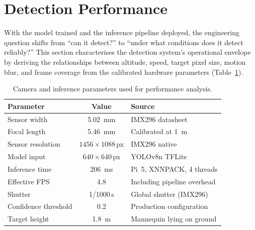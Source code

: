 \documentclass[10pt,a4paper]{article}
\begin{document}

\section{Detection Performance}\label{sec:performance}

With the model trained and the inference pipeline deployed, the engineering question shifts from ``can it detect?'' to ``under what conditions does it detect reliably?'' This section characterises the detection system's operational envelope by deriving the relationships between altitude, speed, target pixel size, motion blur, and frame coverage from the calibrated hardware parameters (Table~\ref{tab:vision-params}).

\begin{table}[ht]
  \centering
  \caption{Camera and inference parameters used for performance analysis.}\label{tab:vision-params}
  \begin{tabular}{@{}l c l@{}}
    \toprule
    \textbf{Parameter} & \textbf{Value} & \textbf{Source} \\
    \midrule
    Sensor width            & \SI{5.02}{\milli\metre} & IMX296 datasheet \\
    Focal length            & \SI{5.46}{\milli\metre} & Calibrated at \SI{1}{\metre} \\
    Sensor resolution       & $1456 \times 1088$\,px  & IMX296 native \\
    Model input             & $640 \times 640$\,px    & YOLOv8n TFLite \\
    Inference time          & \SI{206}{\milli\second}  & Pi~5, XNNPACK, 4 threads \\
    Effective FPS           & 4.8                      & Including pipeline overhead \\
    Shutter                 & 1/1000\,s               & Global shutter (IMX296) \\
    Confidence threshold    & 0.2                      & Production configuration \\
    Target height           & \SI{1.8}{\metre}         & Mannequin lying on ground \\
    \bottomrule
  \end{tabular}
\end{table}
\end{document}
